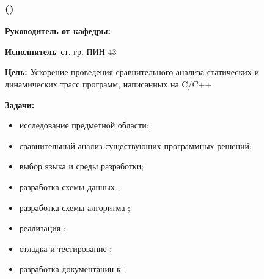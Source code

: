 \begin{frame}
    \frametitle{\textbf{\thesisTitle} ({\ProgModule})}
\textbf{Руководитель от кафедры:}~\supervisorRegaliaShort~\supervisorFioShort

\textbf{Исполнитель}~ст. гр. ПИН-43~\thesisAuthorShort

\textbf{Цель:} Ускорение проведения сравнительного анализа статических и динамических трасс программ, написанных на C/C++

\textbf{Задачи:}
\begin{itemize}
    \item исследование предметной области;
    \item сравнительный анализ существующих программных решений;
    \item выбор языка и среды разработки;
    \item разработка схемы данных {\ProgModule};
    \item разработка схемы алгоритма {\ProgModule};
    \item реализация {\ProgModule};
    \item отладка и тестирование {\ProgModule};
    \item разработка документации к {\ProgModule};
\end{itemize}
\end{frame}
